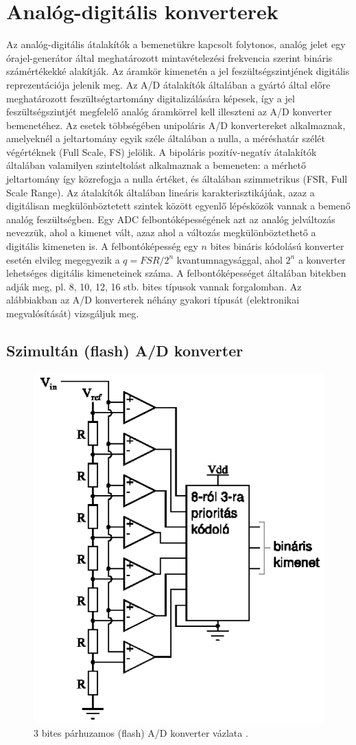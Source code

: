 \documentclass[12pt]{article}
\theoremstyle{plain}
\begin{document}
\section{Analóg-digitális konverterek}

Az analóg-digitális átalakítók a bemenetükre kapcsolt folytonos, analóg jelet egy órajel-generátor által meghatározott mintavételezési frekvencia szerint bináris számértékekké alakítják. Az áramkör kimenetén a jel feszültségszintjének digitális reprezentációja jelenik meg. Az A/D átalakítók általában a gyártó által előre meghatározott feszültségtartomány digitalizálására képesek, így a jel feszültségszintjét megfelelő analóg áramkörrel kell illeszteni az A/D konverter bemenetéhez. Az esetek többségében unipoláris A/D konvertereket alkalmaznak, amelyeknél a jeltartomány egyik széle általában a nulla, a méréshatár szélét végértéknek (Full Scale, FS) jelölik. A bipoláris pozitív-negatív átalakítók általában valamilyen szinteltolást alkalmaznak a bemeneten: a mérhető jeltartomány így közrefogja a nulla értéket, és általában szimmetrikus (FSR, Full Scale Range). Az átalakítók általában lineáris karakterisztikájúak, azaz a digitálisan megkülönböztetett szintek között egyenlő lépésközök vannak a bemenő analóg feszültségben. Egy ADC felbontóképességének azt az analóg jelváltozás nevezzük, ahol a kimenet vált, azaz ahol a változás megkülönböztethető a digitális kimeneten is. A felbontóképesség egy $n$ bites bináris kódolású konverter esetén elvileg megegyezik a $q = FSR/2^n$ kvantumnagysággal, ahol $2^n$ a konverter lehetséges digitális kimeneteinek száma. A felbontóképességet általában bitekben adják meg, pl. 8, 10, 12,
16 stb. bites típusok vannak forgalomban. Az alábbiakban az A/D konverterek néhány gyakori típusát (elektronikai megvalósítását) vizsgáljuk meg.


\subsection{Szimultán (flash) A/D konverter \cite{Bagoly}}

\begin{figure}[]
	\centering
	\includegraphics[width=0.5\linewidth]{media/ADC_flash}
	\caption{3 bites párhuzamos (flash) A/D konverter vázlata \cite{Bagoly}.}
	\label{fig:adcflash}
\end{figure}
\end{document}
